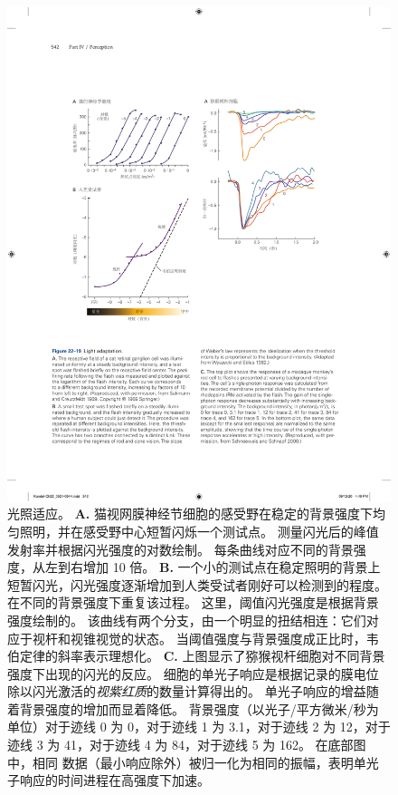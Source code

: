 \begin{figure}[htbp]
	\centering
	\includegraphics[width=1.0\linewidth]{chap22/fig_22_19}
	\caption{光照适应。 
		\textbf{A.} 猫视网膜神经节细胞的感受野在稳定的背景强度下均匀照明，并在感受野中心短暂闪烁一个测试点。 
		测量闪光后的峰值发射率并根据闪光强度的对数绘制。
		每条曲线对应不同的背景强度，从左到右增加 10 倍\cite{sakmann1969scotopic}。
		\textbf{B.} 一个小的测试点在稳定照明的背景上短暂闪光，闪光强度逐渐增加到人类受试者刚好可以检测到的程度。
		在不同的背景强度下重复该过程。
		这里，阈值闪光强度是根据背景强度绘制的。
		该曲线有两个分支，由一个明显的扭结相连：它们对应于视杆和视锥视觉的状态。 
		当阈值强度与背景强度成正比时，韦伯定律的斜率表示理想化\cite{wyszecki2000color}。
		\textbf{C.} 上图显示了猕猴视杆细胞对不同背景强度下出现的闪光的反应。 
		细胞的单光子响应是根据记录的膜电位除以闪光激活的\textit{视紫红质}的数量计算得出的。 
		单光子响应的增益随着背景强度的增加而显着降低。 
		背景强度（以光子/平方微米/秒为单位）对于迹线 0 为 0，对于迹线 1 为 3.1，对于迹线 2 为 12，对于迹线 3 为 41，对于迹线 4 为 84，对于迹线 5 为 162。
		在底部图中，相同 数据（最小响应除外）被归一化为相同的振幅，表明单光子响应的时间进程在高强度下加速\cite{schneeweis2000noise}。}
	\label{fig:22_19}
\end{figure}


